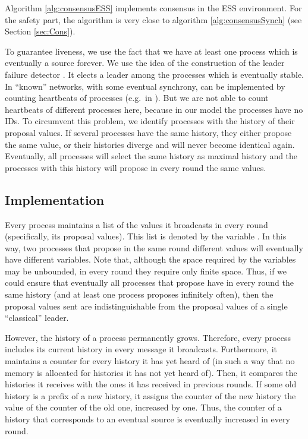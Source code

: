 \documentclass[conference, compsoc]{IEEEtran}
\begin{document}
Algorithm \ref{alg:consensusESS} implements consensus in the ESS environment. For the safety part, the algorithm is very close to algorithm \ref{alg:consensusSynch} (see Section \ref{sec:Cons}). 

To guarantee liveness, we use the fact that we have at least one process which is eventually a source forever. We use the idea of the construction of the leader failure detector  \cite{journals/jacm/ChandraHT96}. It elects a leader among the processes which is eventually stable. In ``known'' networks, with some eventual synchrony,  can be implemented by counting heartbeats of processes (e.g.~in \cite{872081}). But we are not able to count heartbeats of different processes here, because in our model the processes have no IDs. To circumvent this problem, we identify processes with the history of their proposal values. If several processes have the same history, they either propose the same value, or their histories diverge and will never become identical again. Eventually, all processes will select the same history as maximal history and the processes with this history will propose in every round the same values. 

\subsection{Implementation}

Every process maintains a list of the values it broadcasts in every round (specifically, its proposal values). This list is denoted by the variable . In this way, two processes that propose in the same round different values will eventually have different  variables. Note that, although the space required by the variables may be unbounded, in every round they require only finite space. Thus, if we could ensure that eventually all processes that propose have in every round the same history (and at least one process proposes infinitely often), then the proposal values sent are indistinguishable from the proposal values of a single ``classical'' leader.

However, the history of a process permanently grows. Therefore, every process includes its current history in every message it broadcasts. Furthermore, it maintains a counter  for every history it has yet heard of (in such a way that no memory is allocated for histories it has not yet heard of). Then, it compares the histories it receives with the ones it has received in previous rounds. If some old history is a prefix of a new history, it assigns the counter of the new history the value of the counter of the old one, increased by one. Thus, the counter of a history that corresponds to an eventual source is eventually increased in every round. 
\end{document}
